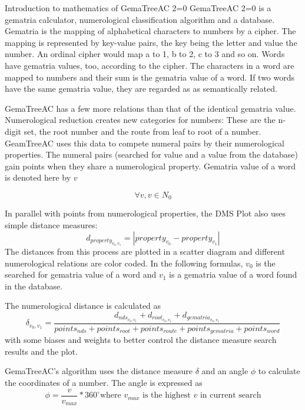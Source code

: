 \documentclass[a4paper,10pt]{article}
\begin{document}
   \begin{section}{Introduction to mathematics of GemaTreeAC 2=0}
     GemaTreeAC 2=0 is a gematria calculator, numerological classification algorithm and a database.
     Gematria is the mapping of alphabetical characters to numbers by a cipher. The mapping is represented by
     key-value pairs, the key being the letter and value the number. An ordinal cipher would map a to 1, b to 2,
     c to 3 and so on. Words have gematria values, too, according to the cipher. The characters in a word are mapped to
     numbers and their sum is the gematria value of a word. If two words have the same gematria value,
     they are regarded as as semantically related.

     GemaTreeAC has a few more relations than that of the identical gematria value.
     Numerological reduction creates new categories for numbers:
     These are the n-digit set, the root number and the
     route from leaf to root of a number. GeamTreeAC uses this data
     to compete numeral pairs by their numerological properties. The numeral pairs (searched for value and a value
     from the database) gain points when they share a numerological property.
     Gematria value of a word is denoted here by $v$
     
     \[
     \forall v, v \in N_0
     \]


     In parallel with points from numerological properties, the DMS Plot also uses simple distance measures:
     \[d_{property_{v_0,v_1}} = |property_{v_0} - property_{v_1}|\] The distances from
     this process are plotted in a scatter diagram and
     different numerological relations are color coded. In the following formulas, $v_0$
     is the searched for gematria value of a word and $v_1$ is a gematria value of a word found in the database.

     The numerological distance is calculated as
     \[
     \delta_{v_0, v_1} = \frac{  d_{nds_{v_0,v_1}} + d_{root_{v_0,v_1}} + d_{gematria_{v_0,v_1}}  }
     {  points_{nds} + points_{root} + points_{route} + points_{gematria} + points_{word}  }
     \] with some biases and weights to better control the distance measure search results and the plot.

     GemaTreeAC's algorithm uses the distance measure $\delta$ and an angle $\phi$ to calculate the coordinates of a number.
     The angle is expressed as
     \[
     \phi = \frac{v}{v_{max}}*360^\circ \textrm{where $v_{max}$ is the highest $v$ in current search} 
     \]


\end{section}
\end{document}
